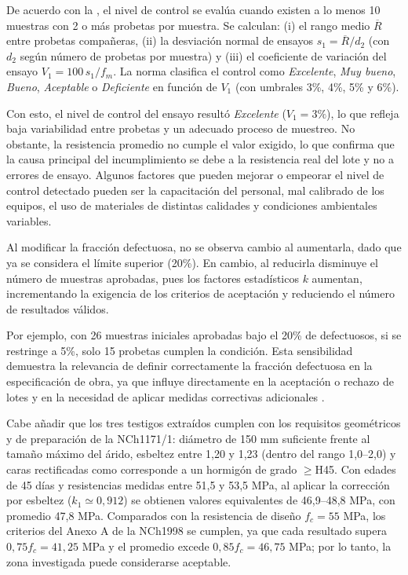 De acuerdo con la \citep{NCh1998}, el nivel de control se evalúa cuando existen a lo menos 10 muestras con 2 o más probetas por muestra. Se calculan: (i) el rango medio $\overline{R}$ entre probetas compañeras, (ii) la desviación normal de ensayos $s_1=\overline{R}/d_2$ (con $d_2$ según número de probetas por muestra) y (iii) el coeficiente de variación del ensayo $V_1=100\,s_1/f_m$. La norma clasifica el control como \emph{Excelente}, \emph{Muy bueno}, \emph{Bueno}, \emph{Aceptable} o \emph{Deficiente} en función de $V_1$ (con umbrales 3\%, 4\%, 5\% y 6\%).

Con esto, el nivel de control del ensayo resultó \textit{Excelente} ($V_1 = 3\%$), lo que refleja baja variabilidad entre probetas y un adecuado proceso de muestreo. No obstante, la resistencia promedio no cumple el valor exigido, lo que confirma que la causa principal del incumplimiento se debe a la resistencia real del lote y no a errores de ensayo. Algunos factores que pueden mejorar o empeorar el nivel de control detectado pueden ser la capacitación del personal, mal calibrado de los equipos, el uso de materiales de distintas calidades y condiciones ambientales variables.

Al modificar la fracción defectuosa, no se observa cambio al aumentarla, dado que ya se considera el límite superior (20\%). En cambio, al reducirla disminuye el número de muestras aprobadas, pues los factores estadísticos $k$ aumentan, incrementando la exigencia de los criterios de aceptación y reduciendo el número de resultados válidos.

Por ejemplo, con 26 muestras iniciales aprobadas bajo el 20\% de defectuosos, si se restringe a 5\%, solo 15 probetas cumplen la condición. Esta sensibilidad demuestra la relevancia de definir correctamente la fracción defectuosa en la especificación de obra, ya que influye directamente en la aceptación o rechazo de lotes y en la necesidad de aplicar medidas correctivas adicionales \citep{NCh1998}.

Cabe añadir que los tres testigos extraídos cumplen con los requisitos geométricos y de preparación de la NCh1171/1: diámetro de 150 mm suficiente frente al tamaño máximo del árido, esbeltez entre 1,20 y 1,23 (dentro del rango 1,0–2,0) y caras rectificadas como corresponde a un hormigón de grado $\ge$H45. Con edades de 45 días y resistencias medidas entre 51,5 y 53,5 MPa, al aplicar la corrección por esbeltez ($k_1\simeq0,912$) se obtienen valores equivalentes de 46,9–48,8 MPa, con promedio 47,8 MPa. Comparados con la resistencia de diseño $f_c=55$ MPa, los criterios del Anexo A de la NCh1998 se cumplen, ya que cada resultado supera $0,75f_c=41,25$ MPa y el promedio excede $0,85f_c=46,75$ MPa; por lo tanto, la zona investigada puede considerarse aceptable. 

